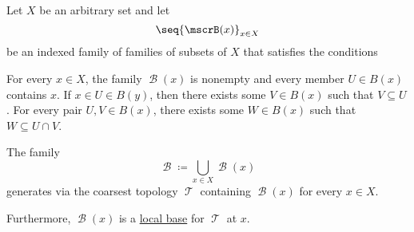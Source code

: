 \begin{proposition}\label{thm:topology_from_local_base}
  Let \( X \) be an arbitrary set and let
  \begin{equation*}
    \seq{ \mscrB(x) }_{x \in X}
  \end{equation*}
  be an indexed family of families of subsets of \( X \) that satisfies the conditions
  \begin{thmenum}
     For every \( x \in X \), the family \( \mscrB(x) \) is nonempty and every member \( U \in B(x) \) contains \( x \).
     If \( x \in U \in B(y) \), then there exists some \( V \in B(x) \) such that \( V \subseteq U \).
     For every pair \( U, V \in B(x) \), there exists some \( W \in B(x) \) such that \( W \subseteq U \cap V \).
  \end{thmenum}

  The family
  \begin{equation*}
    \mscrB \coloneqq \bigcup_{x \in X} \mscrB(x)
  \end{equation*}
  generates via  the coarsest topology \( \mscrT \) containing \( \mscrB(x) \) for every \( x \in X \).

  Furthermore, \( \mscrB(x) \) is a \hyperref[def:topological_local_base]{local base} for \( \mscrT \) at \( x \).
\end{proposition}
